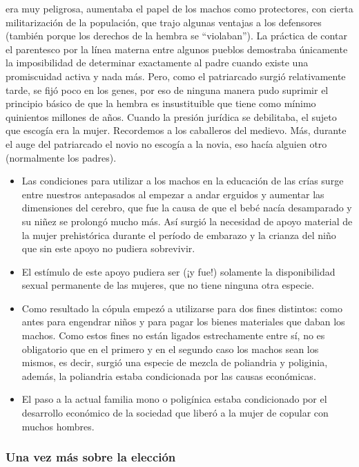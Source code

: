 era muy peligrosa, aumentaba el papel de los machos como protectores,
con cierta militarización de la populación, que trajo algunas ventajas a
los defensores (también porque los derechos de la hembra se
``violaban''). La práctica de contar el parentesco por la línea materna
entre algunos pueblos demostraba únicamente la imposibilidad de
determinar exactamente al padre cuando existe una promiscuidad activa y
nada más. Pero, como el patriarcado surgió relativamente tarde, se fijó
poco en los genes, por eso de ninguna manera pudo suprimir el principio
básico de que la hembra es insustituible que tiene como mínimo
quinientos millones de años. Cuando la presión jurídica se debilitaba,
el sujeto que escogía era la mujer. Recordemos a los caballeros del
medievo. Más, durante el auge del patriarcado el novio no escogía a la
novia, eso hacía alguien otro (normalmente los padres).

\begin{itemize}

\item
  Las condiciones para utilizar a los machos en la educación de las
  crías surge entre nuestros antepasados al empezar a andar erguidos y
  aumentar las dimensiones del cerebro, que fue la causa de que el bebé
  nacía desamparado y su niñez se prolongó mucho más. Así surgió la
  necesidad de apoyo material de la mujer prehistórica durante el
  período de embarazo y la crianza del niño que sin este apoyo no
  pudiera sobrevivir.
\item
  El estímulo de este apoyo pudiera ser (¡y fue!) solamente la
  disponibilidad sexual permanente de las mujeres, que no tiene ninguna
  otra especie.
\item
  Como resultado la cópula empezó a utilizarse para dos fines distintos:
  como antes para engendrar niños y para pagar los bienes materiales que
  daban los machos. Como estos fines no están ligados estrechamente
  entre sí, no es obligatorio que en el primero y en el segundo caso los
  machos sean los mismos, es decir, surgió una especie de mezcla de
  poliandria y poliginia, además, la poliandria estaba condicionada por
  las causas económicas.
\item
  El paso a la actual familia mono o poligínica estaba condicionado por
  el desarrollo económico de la sociedad que liberó a la mujer de
  copular con muchos hombres.
\end{itemize}

\protect\hypertarget{M16}{}{}

\hypertarget{una-vez-muxe1s-sobre-la-elecciuxf3n}{\subsubsection{Una vez más sobre la elección}\label{una-vez-muxe1s-sobre-la-elecciuxf3n}}

